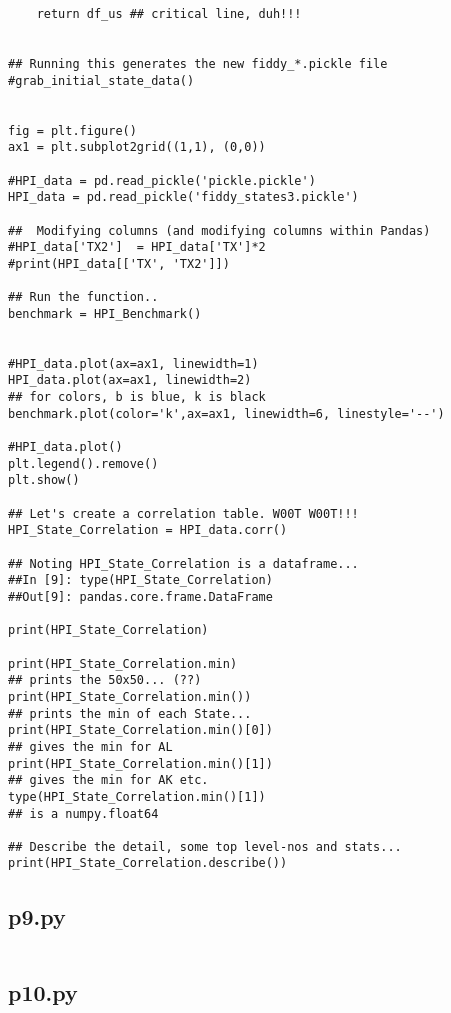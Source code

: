 \documentclass[11pt,a4paper]{article}
\begin{document}
\begin{lstlisting}
    return df_us ## critical line, duh!!! 

        
## Running this generates the new fiddy_*.pickle file
#grab_initial_state_data()


fig = plt.figure()
ax1 = plt.subplot2grid((1,1), (0,0))

#HPI_data = pd.read_pickle('pickle.pickle')
HPI_data = pd.read_pickle('fiddy_states3.pickle')

##  Modifying columns (and modifying columns within Pandas)
#HPI_data['TX2']  = HPI_data['TX']*2
#print(HPI_data[['TX', 'TX2']])

## Run the function..
benchmark = HPI_Benchmark()


#HPI_data.plot(ax=ax1, linewidth=1)
HPI_data.plot(ax=ax1, linewidth=2)
## for colors, b is blue, k is black
benchmark.plot(color='k',ax=ax1, linewidth=6, linestyle='--')

#HPI_data.plot()
plt.legend().remove()
plt.show()

## Let's create a correlation table. W00T W00T!!!
HPI_State_Correlation = HPI_data.corr()

## Noting HPI_State_Correlation is a dataframe...
##In [9]: type(HPI_State_Correlation)
##Out[9]: pandas.core.frame.DataFrame

print(HPI_State_Correlation)

print(HPI_State_Correlation.min)         
## prints the 50x50... (??)
print(HPI_State_Correlation.min())       
## prints the min of each State...
print(HPI_State_Correlation.min()[0])  
## gives the min for AL
print(HPI_State_Correlation.min()[1])  
## gives the min for AK etc. 
type(HPI_State_Correlation.min()[1])   
## is a numpy.float64

## Describe the detail, some top level-nos and stats...
print(HPI_State_Correlation.describe())
\end{lstlisting}
\clearpage



\subsection{p9.py} 
\smallskip
\smallskip
\noindent 
\begin{lstlisting}

\end{lstlisting}
\clearpage


\subsection{p10.py} 
\smallskip
\smallskip
\noindent 
\begin{lstlisting}

\end{lstlisting}
\clearpage
\end{document}
